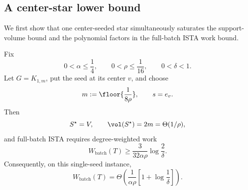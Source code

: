 \subsection{A center-star lower bound}
\label{subsec:rppr-center-star-lower}

We first show that one center-seeded star simultaneously saturates the
support-volume bound and the polynomial factors in the full-batch ISTA work
bound.

\begin{theorem}
\label{thm:rppr-center-star-lower}
Fix
\begin{equation}
    0<\alpha\leq\frac14,
    \qquad
    0<\rho\leq\frac1{16},
    \qquad
    0<\delta<1.
    \label{eq:rppr-star-parameter-range}
\end{equation}
Let \(G=K_{1,m}\), put the seed at its center \(v\), and choose
\begin{equation}
    m:=\floor{\frac1{8\rho}},
    \qquad
    s=e_v.
    \label{eq:rppr-star-size}
\end{equation}
Then
\begin{equation}
    S^\star=V,
    \qquad
    \vol(S^\star)=2m=\Theta(1/\rho),
    \label{eq:rppr-star-full-support}
\end{equation}
and full-batch ISTA requires degree-weighted work
\begin{equation}
    W_{\mathrm{batch}}(T)
    \geq
    \frac{3}{32\alpha\rho}\log\frac2\delta.
    \label{eq:rppr-star-work-lower}
\end{equation}
Consequently, on this single-seed instance,
\begin{equation}
    W_{\mathrm{batch}}(T)
    =
    \Theta\left(
        \frac{1}{\alpha\rho}
        \left[1+\log\frac1\delta\right]
    \right).
    \label{eq:rppr-star-tight-order}
\end{equation}
\end{theorem}

